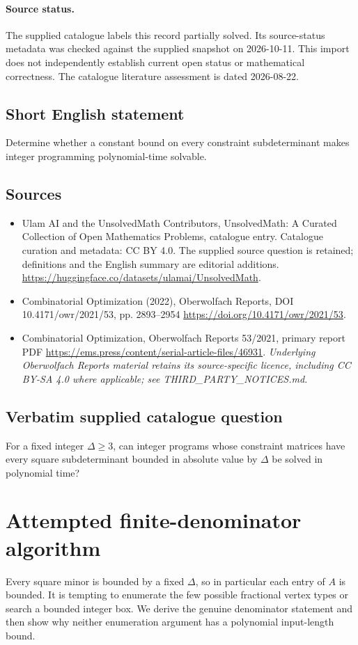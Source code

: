 \documentclass[11pt]{article}
\begin{document}
\paragraph{Source status.}
The supplied catalogue labels this record partially solved. Its source-status metadata was checked against the supplied snapshot on 2026-10-11. This import does not independently establish current open status or mathematical correctness. The catalogue literature assessment is dated 2026-08-22.
\subsection{Short English statement}
Determine whether a constant bound on every constraint subdeterminant makes integer programming polynomial-time solvable.
\subsection{Sources}
\begin{itemize}
\item[S1] Ulam AI and the UnsolvedMath Contributors, UnsolvedMath: A Curated Collection of Open Mathematics Problems, catalogue entry. Catalogue curation and metadata: CC BY 4.0. The supplied source question is retained; definitions and the English summary are editorial additions.
\url{https://huggingface.co/datasets/ulamai/UnsolvedMath}.
\item[S2] Combinatorial Optimization (2022), Oberwolfach Reports, DOI 10.4171/owr/2021/53, pp. 2893--2954
\url{https://doi.org/10.4171/owr/2021/53}.
\item[S3] Combinatorial Optimization, Oberwolfach Reports 53/2021, primary report PDF
\url{https://ems.press/content/serial-article-files/46931}.
\textit{Underlying Oberwolfach Reports material retains its source-specific licence, including CC BY-SA 4.0 where applicable; see THIRD\_PARTY\_NOTICES.md.}
\end{itemize}
\subsection{Verbatim supplied catalogue question}
For a fixed integer $\Delta\geq3$, can integer programs whose constraint matrices have every square subdeterminant bounded in absolute value by $\Delta$ be solved in polynomial time?

\section{Attempted finite-denominator algorithm}
Every square minor is bounded by a fixed $\Delta$, so in particular
each entry of $A$ is bounded. It is tempting to enumerate the
few possible fractional vertex types or search a bounded integer box.
We derive the genuine denominator statement and then show why neither
enumeration argument has a polynomial input-length bound.
\end{document}
